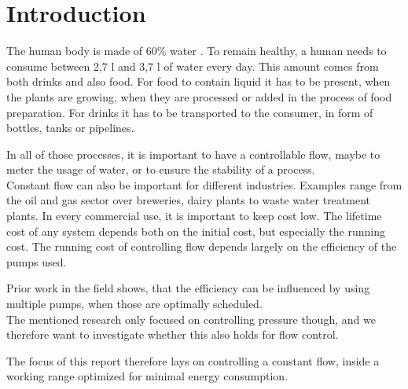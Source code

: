 \chapter{Introduction}\label{ch:introduction}
The human body is made of 60\% water \cite{HumanWater}.
To remain healthy,
a human needs to consume between 2,7 l and 3,7 l of water every day. \cite{DailyWater}
This amount comes from both drinks and also food.
For food to contain liquid it has to be present,
when the plants are growing,
when they are processed or added in the process of food preparation.
For drinks it has to be transported to the consumer,
in form of bottles, tanks or pipelines.

In all of those processes,
it is important to have a controllable flow,
maybe to meter the usage of water,
or to ensure the stability of a process.\\
Constant flow can also be important for different industries.
Examples range from the oil and gas sector\cite{OilFlow} over breweries\cite{BrewFlow},
dairy plants\cite{DairyFlow} to waste water treatment plants\cite{WastewaterFlow}.
In every commercial use,
it is important to keep cost low.
The lifetime cost of any system depends both on the initial cost,
but especially the running cost. \cite{LifetimeCost}
The running cost of controlling flow depends largely on the efficiency of the pumps used.\cite{Volk2014}

Prior work in the field shows, that the efficiency can be influenced by using multiple pumps,
when those are optimally scheduled. \cite{YangMultiPump2008}\\
The mentioned research only focused on controlling pressure though,
and we therefore want to investigate whether this also holds for flow control.

The focus of this report therefore lays on controlling a constant flow,
inside a working range optimized for minimal energy consumption.
%
%
%
%
%
%
%
%
%
%
%
%

